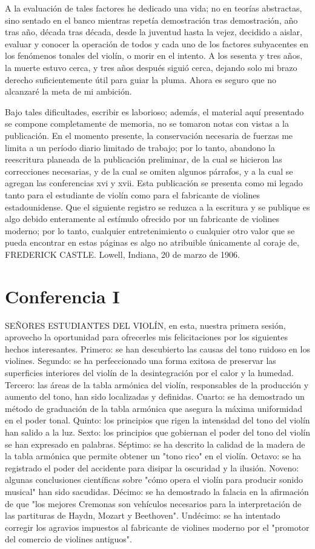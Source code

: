 \documentclass[12pt]{book}
\begin{document}
A la evaluación de tales factores he dedicado una vida; no en teorías abstractas, sino sentado en el banco mientras repetía demostración tras demostración, año tras año, década tras década, desde la juventud hasta la vejez, decidido a aislar, evaluar y conocer la operación de todos y cada uno de los factores subyacentes en los fenómenos tonales del violín, o morir en el intento. A los sesenta y tres años, la muerte estuvo cerca, y tres años después siguió cerca, dejando solo mi brazo derecho suficientemente útil para guiar la pluma. Ahora es seguro que no alcanzaré la meta de mi ambición.

Bajo tales dificultades, escribir es laborioso; además, el material aquí presentado se compone completamente de memoria, no se tomaron notas con vistas a la publicación. En el momento presente, la conservación necesaria de fuerzas me limita a un período diario limitado de trabajo; por lo tanto, abandono la reescritura planeada de la publicación preliminar, de la cual se hicieron las correcciones necesarias, y de la cual se omiten algunos párrafos, y a la cual se agregan las conferencias xvi y xvii. Esta publicación se presenta como mi legado tanto para el estudiante de violín como para el fabricante de violines estadounidense. Que el siguiente registro se reduzca a la escritura y se publique es algo debido enteramente al estímulo ofrecido por un fabricante de violines moderno; por lo tanto, cualquier entretenimiento o cualquier otro valor que se pueda encontrar en estas páginas es algo no atribuible únicamente al coraje de, FREDERICK CASTLE. Lowell, Indiana, 20 de marzo de 1906.

\chapter*{Conferencia I}
SEÑORES ESTUDIANTES DEL VIOLÍN, en esta, nuestra primera sesión, aprovecho la oportunidad para ofrecerles mis felicitaciones por los siguientes hechos interesantes. Primero: se han descubierto las causas del tono ruidoso en los violines. Segundo: se ha perfeccionado una forma exitosa de preservar las superficies interiores del violín de la desintegración por el calor y la humedad. Tercero: las áreas de la tabla armónica del violín, responsables de la producción y aumento del tono, han sido localizadas y definidas. Cuarto: se ha demostrado un método de graduación de la tabla armónica que asegura la máxima uniformidad en el poder tonal. Quinto: los principios que rigen la intensidad del tono del violín han salido a la luz. Sexto: los principios que gobiernan el poder del tono del violín se han expresado en palabras. Séptimo: se ha descrito la calidad de la madera de la tabla armónica que permite obtener un "tono rico" en el violín. Octavo: se ha registrado el poder del accidente para disipar la oscuridad y la ilusión. Noveno: algunas conclusiones científicas sobre "cómo opera el violín para producir sonido musical" han sido sacudidas. Décimo: se ha demostrado la falacia en la afirmación de que "los mejores Cremonas son vehículos necesarios para la interpretación de las partituras de Haydn, Mozart y Beethoven". Undécimo: se ha intentado corregir los agravios impuestos al fabricante de violines moderno por el "promotor del comercio de violines antiguos".
\end{document}
